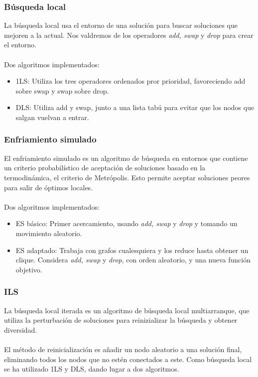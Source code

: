 \documentclass{beamer}
\begin{document}
\begin{frame}
  \frametitle{Búsqueda local}
   La búsqueda local usa el entorno de una solución para buscar soluciones que mejoren a la actual.
   Nos valdremos de los operadores \textit{add, swap} y \textit{drop} para crear el entorno. \\~\\

  Dos algoritmos implementados:
  \begin{itemize}
    \item 1LS: Utiliza los tres operadores ordenados pror prioridad, favoreciendo add sobre swap y swap sobre drop.
    \item DLS: Utiliza add y swap, junto a una lista tabú para evitar que los nodos que salgan vuelvan a entrar.
  \end{itemize}

\end{frame}


\begin{frame}
  \frametitle{Enfriamiento simulado}
   El enfriamiento simulado es un algoritmo de búsqueda en entornos que contiene un criterio probabilístico
   de aceptación de soluciones basado en la termodinámica, el criterio de Metrópolis. Esto permite aceptar soluciones
   peores para salir de óptimos locales. \\~\\

  Dos algoritmos implementados:
  \begin{itemize}
    \item ES básico: Primer acercamiento, usando \textit{add, swap} y \textit{drop} y tomando un movimiento aleatorio.
    \item ES adaptado: Trabaja con grafos cualesquiera y los reduce hasta obtener un clique. Considera \textit{add, swap} y \textit{drop},
    con orden aleatorio, y una nueva función objetivo.
  \end{itemize}

\end{frame}


\begin{frame}
  \frametitle{ILS}
   La búsqueda local iterada es un algoritmo de búsqueda local multiarranque, que utiliza la perturbación de soluciones para
   reinizializar la búsqueda y obtener diversidad. \\~\\

   El método de reinicialización es añadir un nodo aleatorio a una solución final, eliminando todos los nodos que no estén
   conectados a este. Como búsqueda local se ha utilizado 1LS y DLS, dando lugar a dos algoritmos.

\end{frame}
\end{document}
